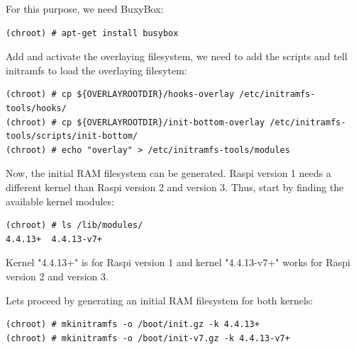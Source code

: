 For this purpose, we need BuxyBox:

\begin{lstlisting}[]
(chroot) # apt-get install busybox
\end{lstlisting}
\FloatBarrier
\vspace{-5mm}

Add and activate the overlaying filesystem, we need to add the scripts and tell initramfs
to load the overlaying filesytem:

\begin{lstlisting}[]
(chroot) # cp ${OVERLAYROOTDIR}/hooks-overlay /etc/initramfs-tools/hooks/
(chroot) # cp ${OVERLAYROOTDIR}/init-bottom-overlay /etc/initramfs-tools/scripts/init-bottom/
(chroot) # echo "overlay" > /etc/initramfs-tools/modules
\end{lstlisting}
\FloatBarrier
\vspace{-5mm}

Now, the initial \ac{RAM} filesystem can be generated. \ac{Raspi} version 1
needs a different kernel than \ac{Raspi} version 2 and version 3. Thus, start
by finding the available kernel modules:


\begin{lstlisting}[]
(chroot) # ls /lib/modules/
4.4.13+  4.4.13-v7+
\end{lstlisting}
\FloatBarrier
\vspace{-5mm}

Kernel "4.4.13+" is for \ac{Raspi} version 1 and kernel "4.4.13-v7+" works
for \ac{Raspi} version 2 and version 3.

Lets proceed by generating an initial \ac{RAM} filesystem for both kernels:



\begin{lstlisting}[]
(chroot) # mkinitramfs -o /boot/init.gz -k 4.4.13+
(chroot) # mkinitramfs -o /boot/init-v7.gz -k 4.4.13-v7+
\end{lstlisting}
\FloatBarrier
\vspace{-5mm}

